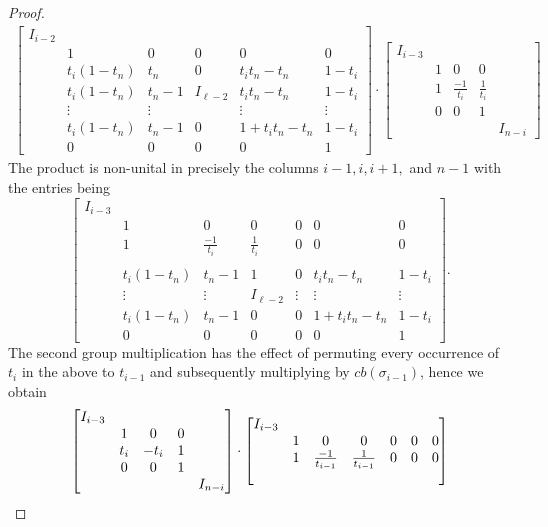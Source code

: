 \documentclass[10pt,a4paper]{amsart}
\begin{document}
\begin{proof}
\begin{align*}
\begin{bmatrix}
			I_{i-2}&\\
			&1 & 0 & 0 & 0&0\\
			&t_i(1-t_n)&t_n & 0 & t_it_n-t_n&1-t_i\\
			&t_i(1-t_n)&t_n-1 & I_{\ell-2} & t_it_n-t_n&1-t_i\\
			&\vdots &\vdots & & \vdots&\vdots \\
			&t_i(1-t_n)&t_n-1 & 0 & 1+t_it_n-t_n &1-t_i\\
			& 0& 0& 0& 0& 1	
		\end{bmatrix}\cdot
		\begin{bmatrix}
			I_{i-3} &  &  &  \\
			& 1 & 0 & 0\\
			& 1& \frac{-1}{t_i} & \frac{1}{t_i}\\
			& 0 & 0 & 1 \\
			& & & & I_{n-i}
		\end{bmatrix}
	\end{align*}
	The product is non-unital in precisely the columns $i-1,i,i+1,$ and $n-1$ with the entries being
	$$\begin{bmatrix}
		I_{i-3}& \\
		&1 & 0 & 0  & 0 & 0 & 0\\
		&1& \frac{-1}{t_i} & \frac{1}{t_i} & 0 & 0 &0\\\\
		&t_i(1-t_n)&t_n-1 & 1 & 0 &t_it_n-t_n&1-t_i\\
		&\vdots & \vdots & I_{\ell-2}&\vdots & \vdots &\vdots \\
		&t_i(1-t_n)&t_n-1 & 0 & 0 & 1+t_it_n-t_n &1-t_i\\
		&0& 0& 0& 0& 0& 1
	\end{bmatrix}.$$
	The second group multiplication has the effect of permuting every occurrence of 
	$t_i$ in the above to $t_{i-1}$ and subsequently multiplying by $cb(\sigma_{i-1})$, 
	hence we obtain
	$${\small\begin{bmatrix}
			I_{i-3}\\
			&1& 0 & 0 \\
			&t_i & -t_i & 1\\
			&0 & 0 & 1\\
			& & & & I_{n-i}
	\end{bmatrix}}\cdot
	\begin{bmatrix}
		I_{i-3}& \\
		&1 & 0 & 0  & 0 & 0 & 0\\
		&1& \frac{-1}{t_{i-1}} & \frac{1}{t_{i-1}} & 0 & 0 &0\\\\

\end{bmatrix}$$
\end{proof}
\end{document}
